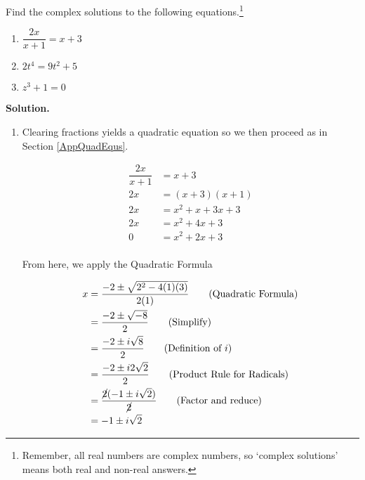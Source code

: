 \begin{ex} \label{complexsolnsreviewex}  Find the complex solutions to the following equations.\footnote{Remember, all real numbers are complex numbers, so `complex solutions' means both real and non-real answers.} 

\begin{multicols}{3}
\begin{enumerate}


\item  $\dfrac{2x}{x+1} = x+3$

\item $2t^4 = 9t^2 + 5$

\item  $z^3 + 1 = 0$

\end{enumerate}
\end{multicols}

{\bf Solution.}

\begin{enumerate}

\enlargethispage{20pt}

\item  Clearing fractions yields a quadratic equation so we then proceed as in Section \ref{AppQuadEqus}.

\begin{align*}
\dfrac{2x}{x+1} & = x+3 \\
2x & = (x+3)(x+1) \tag{Multiply by $(x+1)$ to clear denominators} \\
2x & = x^2 + x + 3x + 3 \tag{F.O.I.L.} \\
2x & = x^2 + 4x + 3 \tag{Gather like terms} \\
0 & = x^2 + 2x + 3 \tag{Subtract $2x$} \\
\end{align*}

From here, we apply the Quadratic Formula

\begin{align*}
x  & = \dfrac{-2 \pm \sqrt{2^2 - 4(1)(3)}}{2(1)} \tag{Quadratic Formula}\\
& = \dfrac{-2 \pm \sqrt{-8}}{2} \tag{Simplify}\\
& = \dfrac{-2 \pm i \sqrt{8}}{2} \tag{Definition of $i$}\\
& = \dfrac{-2 \pm i 2\sqrt{2}}{2} \tag{Product Rule for Radicals}\\
& = \dfrac{\cancel{2}(-1 \pm i\sqrt{2})}{\cancel{2}} \tag{Factor and reduce}\\
& = -1 \pm i \sqrt{2} \\
\end{align*}
		

\end{enumerate}
\end{ex}
